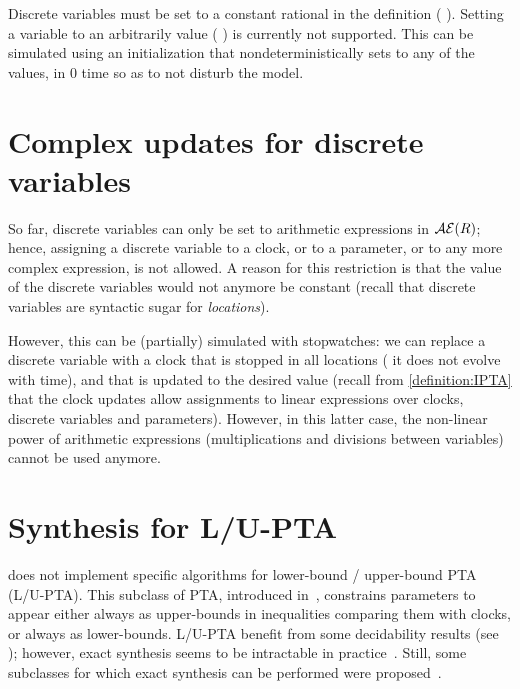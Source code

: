 Discrete variables must be set to a constant rational in the  definition (\eg{} ).
Setting a variable to an arbitrarily value (\eg{} ) is currently not supported.
This can be simulated using an initialization \IPTA{} that nondeterministically sets  to any of the values, in 0 time so as to not disturb the model.


\section{Complex updates for discrete variables}

So far, discrete variables can only be set to arithmetic expressions in $\mathcal{AE}(R)$;
hence, assigning a discrete variable to a clock, or to a parameter, or to any more complex expression, is not allowed.
A reason for this restriction is that the value of the discrete variables would not anymore be constant (recall that discrete variables are syntactic sugar for \emph{locations}).

However, this can be (partially) simulated with stopwatches: we can replace a discrete variable with a clock that is stopped in all locations (\ie{} it does not evolve with time), and that is updated to the desired value (recall from \cref{definition:IPTA} that the clock updates allow assignments to linear expressions over clocks, discrete variables and parameters).
However, in this latter case, the non-linear power of arithmetic expressions (multiplications and divisions between variables) cannot be used anymore.



\section{Synthesis for L/U-PTA}

\imitator{} does not implement specific algorithms for lower-bound / upper-bound PTA (L/U-PTA).
This subclass of PTA, introduced in~\cite{HRSV02}, constrains parameters to appear either always as upper-bounds in inequalities comparing them with clocks, or always as lower-bounds.
L/U-PTA benefit from some decidability results (see \eg{} \cite{HRSV02,BlT09,JLR15,AM15,ALime17}); however, exact synthesis seems to be intractable in practice~\cite{JLR15,ALR16ICFEM}.
Still, some subclasses for which exact synthesis can be performed were proposed~\cite{BlT09,ALR18FORMATS}.

